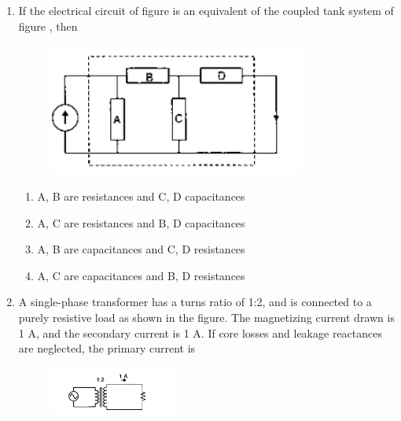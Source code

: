 \documentclass[12pt]{article}
\theoremstyle{remark}
\begin{document}
\begin{enumerate}
\item If the electrical circuit of figure  is an equivalent of the coupled tank system of figure , then
\begin{figure}[H]
    \centering
    \includegraphics[width=0.8\textwidth]{Figs/Q12.png}
    \caption{}
    \label{fig:1.6}
\end{figure}
\begin{enumerate}
    \item A, B are resistances and C, D capacitances
    \item A, C are resistances and B, D capacitances
    \item A, B are capacitances and C, D resistances
    \item A, C are capacitances and B, D resistances
\end{enumerate}
\hfill{}

\item A single-phase transformer has a turns ratio of 1:2, and is connected to a purely resistive load as shown in the figure. The magnetizing current drawn is 1 A, and the secondary current is 1 A. If core losses and leakage reactances are neglected, the primary current is
\begin{figure}[H]
    \centering
    \includegraphics[width=0.4\textwidth]{Figs/Q13.png}
    \caption{}
    \label{fig:1.7}
\end{figure}
\begin{enumerate}
\end{enumerate}
\hfill{}


\end{enumerate}
\end{document}
